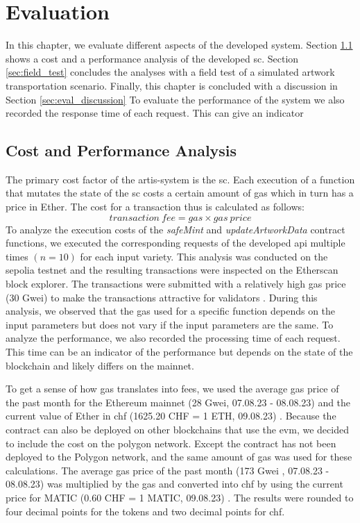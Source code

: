 \chapter{Evaluation}
\label{chap:evaluation}
In this chapter, we evaluate different aspects of the developed system. Section \ref{sec:cost_and_performance} shows a cost and a performance analysis of the developed \gls{sc}. Section \ref{sec:field_test} concludes the analyses with a field test of a simulated artwork transportation scenario. Finally, this chapter is concluded with a discussion in Section \ref{sec:eval_discussion} To evaluate the performance of the system we also recorded the response time of each request. This can give an indicator

\section{Cost and Performance Analysis}
\label{sec:cost_and_performance}
The primary cost factor of the artis-system is the \gls{sc}. Each execution of a function that mutates the state of the \gls{sc} costs a certain amount of gas which in turn has a price in Ether. The cost for a transaction thus is calculated as follows:
$$
transaction\ fee = gas \times gas\ price
$$
To analyze the execution costs of the \textit{safeMint} and \textit{updateArtworkData} contract functions, we executed the corresponding requests of the developed \gls{api} multiple times $(n = 10)$ for each input variety. This analysis was conducted on the sepolia testnet and the resulting transactions were inspected on the Etherscan block explorer. The transactions were submitted with a relatively high gas price (30 Gwei) to make the transactions attractive for validators \cite{ethergas}. During this analysis, we observed that the gas used for a specific function depends on the input parameters but does not vary if the input parameters are the same. To analyze the performance, we also recorded the processing time of each request. This time can be an indicator of the performance but depends on the state of the blockchain and likely differs on the mainnet.

To get a sense of how gas translates into fees, we used the average gas price of the past month for the Ethereum mainnet (28 Gwei, 07.08.23 - 08.08.23) \cite{gaspriceaverageethereum} and the current value of Ether in \gls{chf} (1625.20 CHF = 1 ETH, 09.08.23) \cite{coinmarketcap}. Because the contract can also be deployed on other blockchains that use the \gls{evm}, we decided to include the cost on the polygon network. Except the contract has not been deployed to the Polygon network, and the same amount of gas was used for these calculations. The average gas price of the past month (173 Gwei \cite{gaspriceaveragepolygon}, 07.08.23 - 08.08.23) was multiplied by the gas and converted into \gls{chf} by using the current price for MATIC (0.60 CHF = 1 MATIC, 09.08.23) \cite{coinmarketcap}. The results were rounded to four decimal points for the tokens and two decimal points for \gls{chf}.

